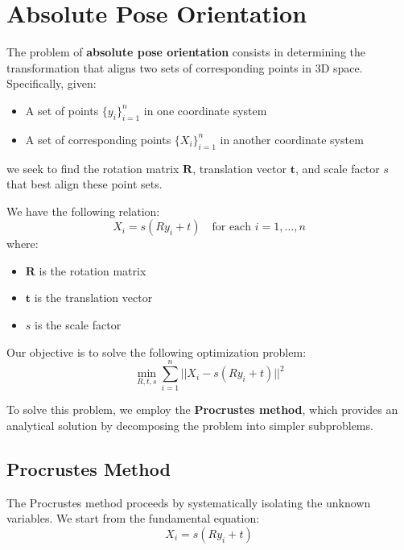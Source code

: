 \documentclass[11pt,a4paper]{article}
\theoremstyle{definition}
\theoremstyle{plain}
\theoremstyle{remark}
\begin{document}
\section{Absolute Pose Orientation}\label{sec:absolute_pose_orientation}

The problem of \textbf{absolute pose orientation} consists in determining the transformation that aligns two sets of corresponding points in 3D space. Specifically, given:

\begin{itemize}
    \item A set of points $\{y_i\}_{i=1}^{n}$ in one coordinate system
    \item A set of corresponding points $\{X_i\}_{i=1}^{n}$ in another coordinate system
\end{itemize}

we seek to find the rotation matrix $\mathbf{R}$, translation vector $\mathbf{t}$, and scale factor $s$ that best align these point sets.

\begin{tcolorbox}[colback=blue!5!white,colframe=blue!75!black,title=\textbf{Problem Formulation}]
We have the following relation:
\begin{equation} \nonumber
    X_i = s (R y_i + t) \quad \text{for each } i = 1, \ldots, n
\end{equation}
where:
\begin{itemize}
    \item $\mathbf{R}$ is the rotation matrix
    \item $\mathbf{t}$ is the translation vector
    \item $s$ is the scale factor
\end{itemize}
Our objective is to solve the following optimization problem:
\begin{equation} \nonumber
    \min_{R, t, s} \sum_{i=1}^{n} ||X_i - s (R y_i + t)||^2
\end{equation}
\end{tcolorbox}

To solve this problem, we employ the \textbf{Procrustes method}, which provides an analytical solution by decomposing the problem into simpler subproblems.

\subsection{Procrustes Method}\label{subsec:procrustes_method}

The Procrustes method proceeds by systematically isolating the unknown variables. We start from the fundamental equation:
\begin{equation} \nonumber
    X_i = s (R y_i + t)
\end{equation}
\end{document}
